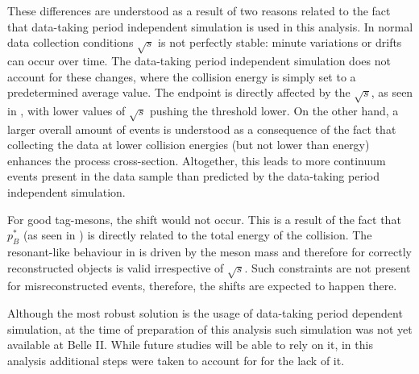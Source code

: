 These differences are understood as a result of two reasons related to the fact that data-taking period independent simulation is used in this analysis.
In normal data collection conditions $\sqrt{s}$ is not perfectly stable: minute variations or drifts can occur over time.
The data-taking period independent simulation does not account for these changes, where the collision energy is simply set to a predetermined average value.
The \Mbc endpoint is directly affected by the $\sqrt{s}$, as seen in , with lower values of $\sqrt{s}$ pushing the \Mbc threshold lower.
On the other hand, a larger overall amount of \qqbar events is understood as a consequence of the fact that collecting the data at lower collision energies (but not lower than \FourS energy) enhances the \mbox{\epem\ra\qqbar} process cross-section.
Altogether, this leads to more continuum events present in the data sample than predicted by the data-taking period independent simulation.

For good tag-\B mesons, the shift would not occur.
This is a result of the fact that $p_B^*$ (as seen in ) is directly related to the total energy of the collision.
The resonant-like behaviour in \Mbc is driven by the \B meson mass and therefore for correctly reconstructed objects is valid irrespective of $\sqrt{s}$. 
Such constraints are not present for misreconstructed events, therefore, the shifts are expected to happen there.

Although the most robust solution is the usage of data-taking period dependent simulation, at the time of preparation of this analysis such simulation was not yet available at Belle II.
While future studies will be able to rely on it, in this analysis additional steps were taken to account for for the lack of it.

